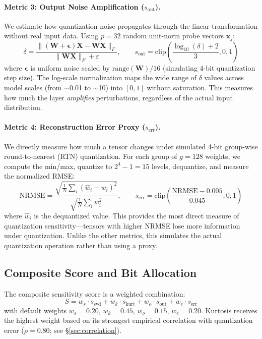 \documentclass{article}
\begin{document}
\paragraph{Metric 3: Output Noise Amplification ($s_\text{out}$).}
We estimate how quantization noise propagates through the linear transformation without real input data. Using $p = 32$ random unit-norm probe vectors $\mathbf{x}_j$:
\begin{equation}
    \delta = \frac{\|(\mathbf{W} + \boldsymbol{\epsilon})\mathbf{X} - \mathbf{W}\mathbf{X}\|_F}{\|\mathbf{W}\mathbf{X}\|_F + \varepsilon}, \qquad
    s_\text{out} = \text{clip}\!\left(\frac{\log_{10}(\delta) + 2}{3}, 0, 1\right)
\end{equation}
where $\boldsymbol{\epsilon}$ is uniform noise scaled by $\text{range}(\mathbf{W})/16$ (simulating 4-bit quantization step size). The log-scale normalization maps the wide range of $\delta$ values across model scales (from $\sim$0.01 to $\sim$10) into $[0, 1]$ without saturation. This measures how much the layer \emph{amplifies} perturbations, regardless of the actual input distribution.

\paragraph{Metric 4: Reconstruction Error Proxy ($s_\text{err}$).}
We directly measure how much a tensor changes under simulated 4-bit group-wise round-to-nearest (RTN) quantization. For each group of $g = 128$ weights, we compute the min/max, quantize to $2^4 - 1 = 15$ levels, dequantize, and measure the normalized RMSE:
\begin{equation}
    \text{NRMSE} = \frac{\sqrt{\frac{1}{N}\sum_i (\hat{w}_i - w_i)^2}}{\sqrt{\frac{1}{N}\sum_i w_i^2}}, \qquad
    s_\text{err} = \text{clip}\!\left(\frac{\text{NRMSE} - 0.005}{0.045}, 0, 1\right)
\end{equation}
where $\hat{w}_i$ is the dequantized value. This provides the most direct measure of quantization sensitivity---tensors with higher NRMSE lose more information under quantization. Unlike the other metrics, this simulates the actual quantization operation rather than using a proxy.

\subsection{Composite Score and Bit Allocation}

The composite sensitivity score is a weighted combination:
\begin{equation}
    S = w_s \cdot s_\text{svd} + w_k \cdot s_\text{kurt} + w_o \cdot s_\text{out} + w_e \cdot s_\text{err}
    \label{eq:composite}
\end{equation}
with default weights $w_s = 0.20$, $w_k = 0.45$, $w_o = 0.15$, $w_e = 0.20$. Kurtosis receives the highest weight based on its strongest empirical correlation with quantization error ($\rho = 0.80$; see \S\ref{sec:correlation}).
\end{document}
